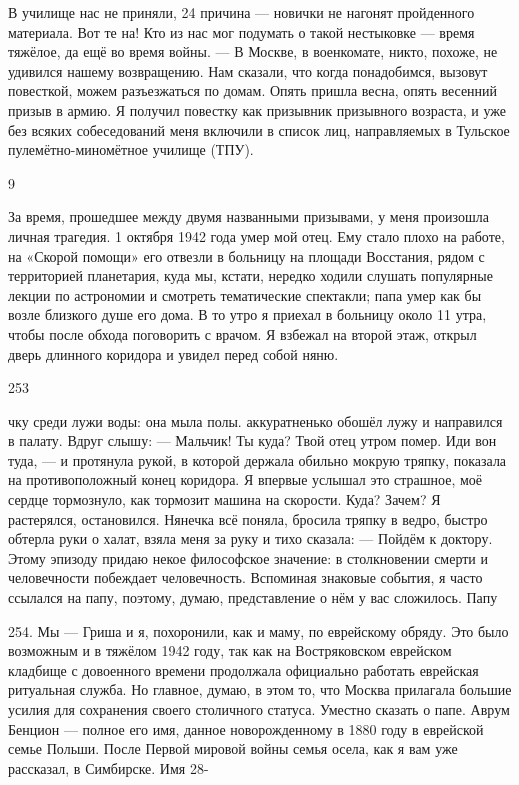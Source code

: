 В училище нас не приняли, 24 причина — новички не нагонят пройденного материала. Вот те на! Кто из нас мог подумать о такой нестыковке — время тяжёлое, да ещё во время войны. — В Москве, в военкомате, никто, похоже, не удивился нашему возвращению. Нам сказали, что когда понадобимся, вызовут повесткой, можем разъезжаться по домам. Опять пришла весна, опять весенний призыв в армию. Я получил повестку как призывник призывного возраста, и уже без всяких собеседований меня включили в список лиц, направляемых в Тульское пулемётно-миномётное училище (ТПУ).

9

За время, прошедшее между двумя названными призывами, у меня произошла личная трагедия. 1 октября 1942 года умер мой отец. Ему стало плохо на работе, на «Скорой помощи» его отвезли в больницу на площади Восстания, рядом с территорией планетария, куда мы, кстати, нередко ходили слушать популярные лекции по астрономии и смотреть тематические спектакли; папа умер как бы возле близкого душе его дома. В то утро я приехал в больницу около 11 утра, чтобы после обхода поговорить с врачом. Я взбежал на второй этаж, открыл дверь длинного коридора и увидел перед собой няню.

253

чку среди лужи воды: она мыла полы. аккуратненько обошёл лужу и направился в палату. Вдруг слышу: — Мальчик! Ты куда? Твой отец утром помер. Иди вон туда, — и протянула рукой, в которой держала обильно мокрую тряпку, показала на противоположный конец коридора. Я впервые услышал это страшное, моё сердце тормознуло, как тормозит машина на скорости. Куда? Зачем? Я растерялся, остановился. Нянечка всё поняла, бросила тряпку в ведро, быстро обтерла руки о халат, взяла меня за руку и тихо сказала: — Пойдём к доктору. Этому эпизоду придаю некое философское значение: в столкновении смерти и человечности побеждает человечность. Вспоминая знаковые события, я часто ссылался на папу, поэтому, думаю, представление о нём у вас сложилось. Папу

254. Мы — Гриша и я, похоронили, как и маму, по еврейскому обряду. Это было возможным и в тяжёлом 1942 году, так как на Востряковском еврейском кладбище с довоенного времени продолжала официально работать еврейская ритуальная служба. Но главное, думаю, в этом то, что Москва прилагала большие усилия для сохранения своего столичного статуса. Уместно сказать о папе. Аврум Бенцион — полное его имя, данное новорожденному в 1880 году в еврейской семье Польши. После Первой мировой войны семья осела, как я вам уже рассказал, в Симбирске. Имя 28-

